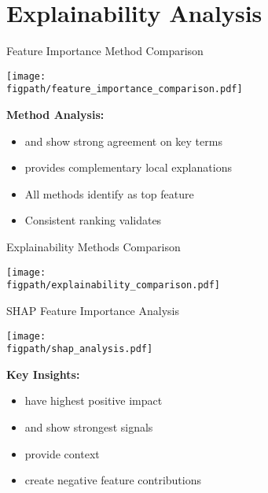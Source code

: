 
\section{Explainability Analysis}

\begin{frame}{Feature Importance Method Comparison}
\begin{center}
\texttt{[image: \\figpath/feature\_importance\_comparison.pdf]}
\end{center}

\textbf{Method Analysis:}
\begin{itemize}
    \item {} and  show strong agreement on key terms
    \item {} provides complementary local explanations
    \item All methods identify  as top feature
    \item Consistent ranking validates 
\end{itemize}
\end{frame}

\begin{frame}{Explainability Methods Comparison}
\begin{center}
\texttt{[image: \\figpath/explainability\_comparison.pdf]}
\end{center}
\end{frame}

\begin{frame}{SHAP Feature Importance Analysis}
\begin{center}
\texttt{[image: \\figpath/shap\_analysis.pdf]}
\end{center}

\textbf{Key Insights:}
\begin{itemize}
    \item {} have highest positive impact
    \item {} and  show strongest signals
    \item {} provide context
    \item {} create negative feature contributions
\end{itemize}
\end{frame}

